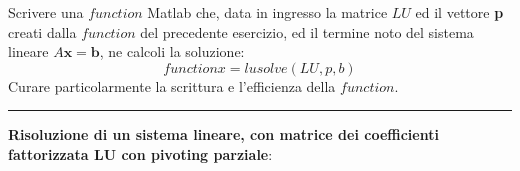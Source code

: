 Scrivere una $function$ Matlab che, data in ingresso la matrice $LU$ ed il vettore \textbf{p} creati dalla $function$ del precedente esercizio, ed il termine noto del sistema lineare $A\textbf{x} = \textbf{b}$, ne calcoli la soluzione:
$$function x = lusolve(LU,p,b)$$
Curare particolarmente la scrittura e l’efficienza della $function$.

\hspace{1cm}
\par\noindent\rule{\textwidth}{0.4pt}
\hspace{1cm}

\textbf{Risoluzione di un sistema lineare, con matrice dei coefficienti fattorizzata LU con pivoting parziale}:

